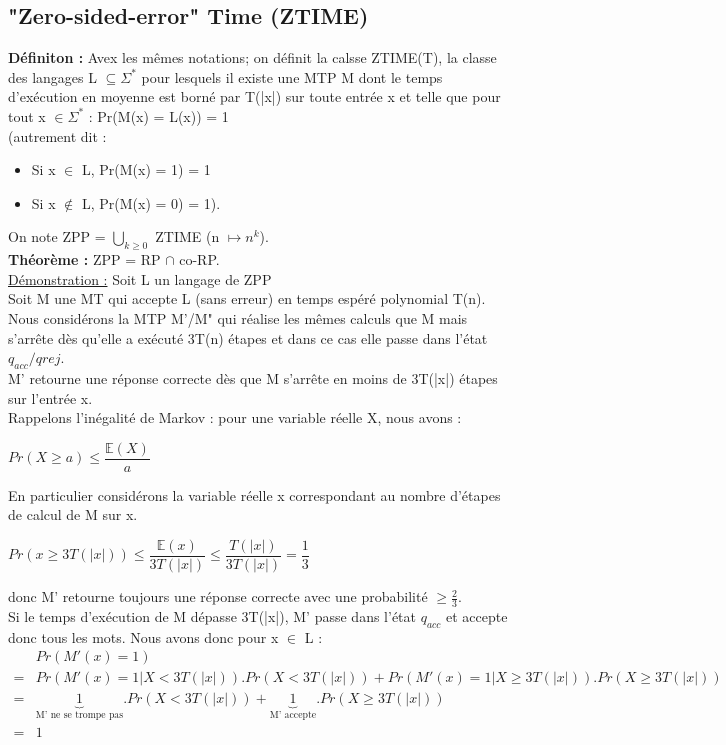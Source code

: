 \documentclass[12pt,a4paper]{article}
\begin{document}
\subsection{"Zero-sided-error" Time (ZTIME)}
\textbf{Définiton :} Avex les mêmes notations; on définit la calsse ZTIME(T), la classe des langages L $\subseteq \Sigma^*$ pour lesquels il existe une MTP M dont le temps d'exécution en moyenne est borné par T(|x|) sur toute entrée x et telle que pour tout x $\in \Sigma^*$ : Pr(M(x) = L(x)) = 1\\(autrement dit :
\begin{itemize}
	\item Si x $\in$ L, Pr(M(x) = 1) = 1
	\item Si x $\not\in$ L, Pr(M(x) = 0) = 1).
\end{itemize}
On note ZPP = $\bigcup\limits_{k \geq 0}$ ZTIME (n $\longmapsto n^k$).\\
\textbf{Théorème :} ZPP = RP $\cap$ co-RP.\\
\underline{Démonstration :} Soit L un langage de ZPP\\
Soit M une MT qui accepte L (sans erreur) en temps espéré polynomial T(n).\\
Nous considérons la MTP M'/M" qui réalise les mêmes calculs que M mais s'arrête dès qu'elle a exécuté 3T(n) étapes et dans ce cas elle passe dans l'état $q_{acc}/q{rej}$.\\
M' retourne une réponse correcte dès que M s'arrête en moins de 3T(|x|) étapes sur l'entrée x.\\
Rappelons l'inégalité de Markov : pour une variable réelle X, nous avons :\\
\begin{center}
	$Pr(X \geq a) \leq \dfrac{\mathbb{E}(X)}{a}$
\end{center}
En particulier considérons la variable réelle x correspondant au nombre d'étapes de calcul de M sur x.
\begin{center}
	$Pr(x \geq 3T(|x|)) \leq \dfrac{\mathbb{E}(x)}{3T(|x|)} \leq \dfrac{T(|x|)}{3T(|x|)} = \dfrac{1}{3}$
\end{center}
donc M' retourne toujours une réponse correcte avec une probabilité $\geq \frac{2}{3}$.\\
Si le temps d'exécution de M dépasse 3T(|x|), M' passe dans l'état $q_{acc}$ et accepte donc tous les mots. Nous avons donc pour x $\in$ L :
\begin{equation}
\begin{split}\nonumber
& Pr(M'(x) = 1)\\
=& Pr(M'(x) = 1 | X < 3T(|x|)).Pr(X < 3T(|x|)) + Pr(M'(x) = 1 | X \geq 3T(|x|)).Pr(X \geq 3T(|x|))\\
=&\underbrace{1}_{\text{M' ne se trompe pas}}.Pr(X < 3T(|x|)) + \underbrace{1}_{\text{M' accepte}}.Pr(X \geq 3T(|x|))\\
=& 1
\end{split}
\end{equation}
\end{document}
